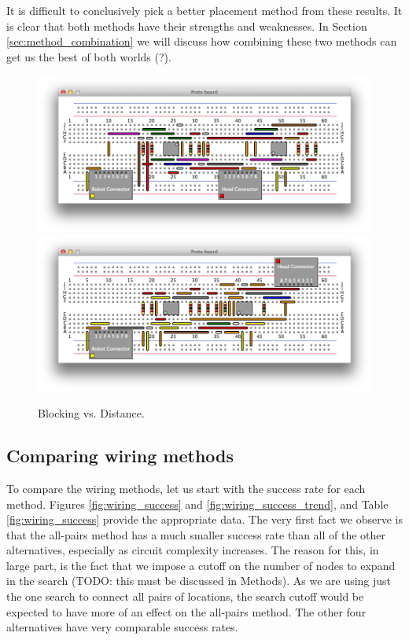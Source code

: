 It is difficult to conclusively pick a better placement method from these results.
It is clear that both methods have their strengths and weaknesses. In Section
\ref{sec:method_combination} we will discuss how combining these two methods can
get us the best of both worlds (?).

\begin{figure}
\begin{center}
\includegraphics[width=\textwidth]{Images/exemplar_per_pair_decreasing.png}
\includegraphics[width=\textwidth]{Images/exemplar_distance.png}
\caption{Blocking vs. Distance.}
\end{center}
\end{figure}

\subsection{Comparing wiring methods}

To compare the wiring methods, let us start with the success rate for each method.
Figures \ref{fig:wiring_success} and \ref{fig:wiring_success_trend}, and Table
\ref{fig:wiring_success} provide the appropriate data. The very first fact we
observe is that the all-pairs method has a much smaller success rate than all of
the other alternatives, especially as circuit complexity increases. The reason
for this, in large part, is the fact that we impose a cutoff on the number of
nodes to expand in the search (TODO: this must be discussed in Methods). As we
are using just the one search to connect all pairs of locations, the search
cutoff would be expected to have more of an effect on the all-pairs method. The
other four alternatives have very comparable success rates.

